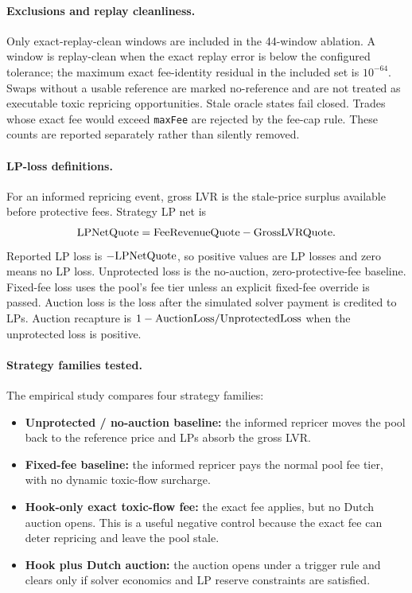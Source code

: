 \documentclass[11pt]{article}
\begin{document}
\paragraph{Exclusions and replay cleanliness.}
Only exact-replay-clean windows are included in the 44-window ablation. A window is replay-clean when the exact replay error is below the configured tolerance; the maximum exact fee-identity residual in the included set is $10^{-64}$. Swaps without a usable reference are marked no-reference and are not treated as executable toxic repricing opportunities. Stale oracle states fail closed. Trades whose exact fee would exceed \texttt{maxFee} are rejected by the fee-cap rule. These counts are reported separately rather than silently removed.

\paragraph{LP-loss definitions.}
For an informed repricing event, gross LVR is the stale-price surplus available before protective fees. Strategy LP net is
\[
  {\rm LPNetQuote} = {\rm FeeRevenueQuote} - {\rm GrossLVRQuote}.
\]
Reported LP loss is $-{\rm LPNetQuote}$, so positive values are LP losses and zero means no LP loss. Unprotected loss is the no-auction, zero-protective-fee baseline. Fixed-fee loss uses the pool's fee tier unless an explicit fixed-fee override is passed. Auction loss is the loss after the simulated solver payment is credited to LPs. Auction recapture is $1-{\rm AuctionLoss}/{\rm UnprotectedLoss}$ when the unprotected loss is positive.

\paragraph{Strategy families tested.}
The empirical study compares four strategy families:
\begin{itemize}
  \item \textbf{Unprotected / no-auction baseline:} the informed repricer moves the pool back to the reference price and LPs absorb the gross LVR.
  \item \textbf{Fixed-fee baseline:} the informed repricer pays the normal pool fee tier, with no dynamic toxic-flow surcharge.
  \item \textbf{Hook-only exact toxic-flow fee:} the exact fee applies, but no Dutch auction opens. This is a useful negative control because the exact fee can deter repricing and leave the pool stale.
  \item \textbf{Hook plus Dutch auction:} the auction opens under a trigger rule and clears only if solver economics and LP reserve constraints are satisfied.
\end{itemize}
\end{document}
